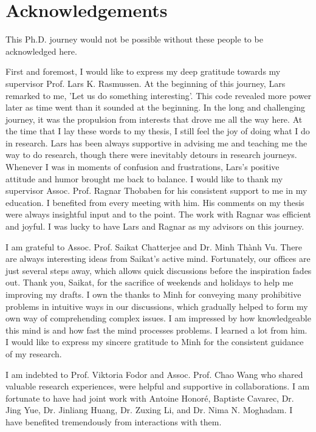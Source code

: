 \chapter{Acknowledgements}
This Ph.D. journey would not be possible without these people to be acknowledged here.

First and foremost, I would like to express my deep gratitude towards my supervisor Prof. Lars K. Rasmussen. At the beginning of this journey, Lars remarked to me, 'Let us do something interesting'. This code revealed more power later as time went than it sounded at the beginning. In the long and challenging journey, it was the propulsion from interests that drove me all the way here. At the time that I lay these words to my thesis, I still feel the joy of doing what I do in research. Lars has been always supportive in advising me and teaching me the way to do research, though there were inevitably detours in research journeys. Whenever I was in moments of confusion and frustrations, Lars's positive attitude and humor brought me back to balance.
I would like to thank my supervisor Assoc. Prof. Ragnar Thobaben for his consistent support to me in my education. I benefited from every meeting with him. His comments on my thesis were always insightful input and to the point. The work with Ragnar was efficient and joyful. I was lucky to have Lars and Ragnar as my advisors on this journey.

I am grateful to Assoc. Prof. Saikat Chatterjee and Dr. Minh Th\`{a}nh Vu. There are always interesting ideas from Saikat's active mind. Fortunately, our offices are just several steps away, which allows quick discussions before the inspiration fades out. Thank you, Saikat, for the sacrifice of weekends and holidays to help me improving my drafts.
I own the thanks to Minh for conveying many prohibitive problems in intuitive ways in our discussions, which gradually helped to form my own way of comprehending complex issues. I am impressed by how knowledgeable this mind is and how fast the mind processes problems. I learned a lot from him. I would like to express my sincere gratitude to Minh for the consistent guidance of my research.

I am indebted to Prof. Viktoria Fodor and Assoc. Prof. Chao Wang who shared valuable research experiences, were helpful and supportive in collaborations. I am fortunate to have had joint work with Antoine Honor{\'e}, Baptiste Cavarec, Dr. Jing Yue, Dr. Jinliang Huang, Dr. Zuxing Li, and Dr. Nima N. Moghadam. I have benefited tremendously from interactions with them.

